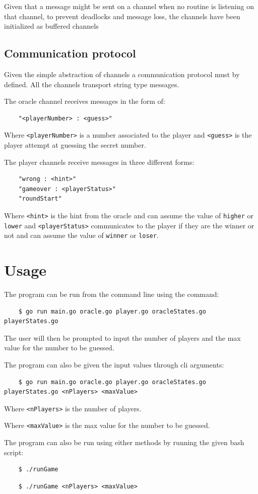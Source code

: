 \documentclass[12pt, a4paper]{report}
\begin{document}
Given that a message might be sent on a channel when no routine is listening on that channel, to prevent deadlocks and message loss, the channels have
 been initialized as buffered channels

\section{Communication protocol}
Given the simple abstraction of channels a communication protocol must by defined. All the channels transport string type messages.

The oracle channel receives messages in the form of:
\begin{lstlisting}
    "<playerNumber> : <guess>"
\end{lstlisting}
Where \verb|<playerNumber>| is a number associated to the player and \verb|<guess>| is the player attempt at guessing the secret number.

The player channels receive messages in three different forms:
\begin{lstlisting}
    "wrong : <hint>"
    "gameover : <playerStatus>"
    "roundStart"
\end{lstlisting}
Where \verb|<hint>| is the hint from the oracle and can assume the value of \verb|higher| or \verb|lower| 
 and \verb|<playerStatus>| communicates to the player if they are the winner or not and can assume the value of \verb|winner| or \verb|loser|.

\chapter{Usage}
The program can be run from the command line using the command:
\begin{lstlisting}
    $ go run main.go oracle.go player.go oracleStates.go playerStates.go
\end{lstlisting}
The user will then be prompted to input the number of players and the max value for the number to be guessed.

The program can also be given the input values through cli arguments:
\begin{lstlisting}
    $ go run main.go oracle.go player.go oracleStates.go playerStates.go <nPlayers> <maxValue>
\end{lstlisting}
Where \verb|<nPlayers>| is the number of players.

Where \verb|<maxValue>| is the max value for the number to be guessed.

The program can also be run using either methods by running the given bash script:
\begin{lstlisting}
    $ ./runGame
\end{lstlisting}
\begin{lstlisting}
    $ ./runGame <nPlayers> <maxValue>
\end{lstlisting}
\end{document}
